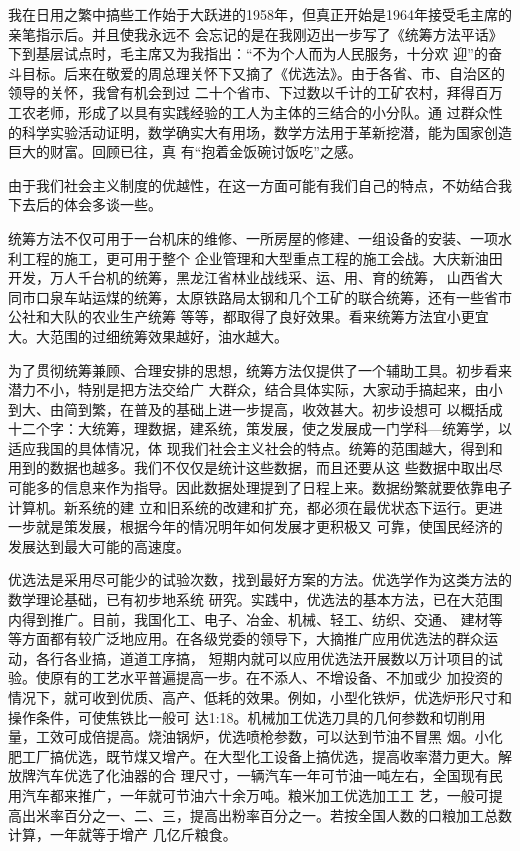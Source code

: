 \documentclass[twoside,openright,headings=optiontohead]{ctexbook} %
\begin{document}
{我在日用之繁中搞些工作始于大跃进的1958年，但真正开始是1964年接受毛主席的亲笔指示后。并且使我永远不
会忘记的是在我刚迈出一步写了《统筹方法平话》下到基层试点时，毛主席又为我指出：``不为个人而为人民服务，十分欢
迎''的奋斗目标。后来在敬爱的周总理关怀下又摘了《优选法》。由于各省、市、自治区的领导的关怀，我曾有机会到过
二十个省市、下过数以千计的工矿农村，拜得百万工农老师，形成了以具有实践经验的工人为主体的三结合的小分队。通
过群众性的科学实验活动证明，数学确实大有用场，数学方法用于革新挖潜，能为国家创造巨大的财富。回顾已往，真
有``抱着金饭碗讨饭吃''之感。

由于我们社会主义制度的优越性，在这一方面可能有我们自己的特点，不妨结合我下去后的体会多谈一些。

统筹方法不仅可用于一台机床的维修、一所房屋的修建、一组设备的安装、一项水利工程的施工，更可用于整个
企业管理和大型重点工程的施工会战。大庆新油田开发，万人千台机的统筹，黑龙江省林业战线采、运、用、育的统筹，
山西省大同市口泉车站运煤的统筹，太原铁路局太钢和几个工矿的联合统筹，还有一些省市公社和大队的农业生产统筹
等等，都取得了良好效果。看来统筹方法宜小更宜大。大范围的过细统筹效果越好，油水越大。

为了贯彻统筹兼顾、合理安排的思想，统筹方法仅提供了一个辅助工具。初步看来潜力不小，特别是把方法交给广
大群众，结合具体实际，大家动手搞起来，由小到大、由简到繁，在普及的基础上进一步提高，收效甚大。初步设想可
以概括成十二个字：大统筹，理数据，建系统，策发展，使之发展成一门学科---统筹学，以适应我国的具体情况，体
现我们社会主义社会的特点。统筹的范围越大，得到和用到的数据也越多。我们不仅仅是统计这些数据，而且还要从这
些数据中取出尽可能多的信息来作为指导。因此数据处理提到了日程上来。数据纷繁就要依靠电子计算机。新系统的建
立和旧系统的改建和扩充，都必须在最优状态下运行。更进一步就是策发展，根据今年的情况明年如何发展才更积极又
可靠，使国民经济的发展达到最大可能的高速度。

优选法是采用尽可能少的试验次数，找到最好方案的方法。优选学作为这类方法的数学理论基础，已有初步地系统
研究。实践中，优选法的基本方法，已在大范围内得到推广。目前，我国化工、电子、冶金、机械、轻工、纺织、交通、
建材等等方面都有较广泛地应用。在各级党委的领导下，大摘推广应用优选法的群众运动，各行各业搞，道道工序搞，
短期内就可以应用优选法开展数以万计项目的试验。使原有的工艺水平普遍提高一步。在不添人、不增设备、不加或少
加投资的情况下，就可收到优质、高产、低耗的效果。例如，小型化铁炉，优选炉形尺寸和操作条件，可使焦铁比一般可
达1:18。机械加工优选刀具的几何参数和切削用量，工效可成倍提高。烧油锅炉，优选喷枪参数，可以达到节油不冒黑
烟。小化肥工厂搞优选，既节煤又增产。在大型化工设备上搞优选，提高收率潜力更大。解放牌汽车优选了化油器的合
理尺寸，一辆汽车一年可节油一吨左右，全国现有民用汽车都来推广，一年就可节油六十余万吨。粮米加工优选加工工
艺，一般可提高出米率百分之一、二、三，提高出粉率百分之一。若按全国人数的口粮加工总数计算，一年就等于增产
几亿斤粮食。

}
\end{document}
